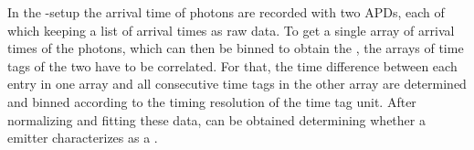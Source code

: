 		In the \HBT{}-setup the arrival time of photons are recorded with two APDs, each of which keeping a list of arrival times as raw data.
		To get a single array of arrival times of the photons, which can then be binned to obtain the \gtf, the arrays of time tags of the two \APDs have to be correlated.
		For that, the time difference between each entry in one array and all consecutive time tags in the other array are determined and binned according to the timing resolution of the time tag unit.
		After normalizing and fitting these data, \gtz can be obtained determining whether a emitter characterizes as a \sps.
